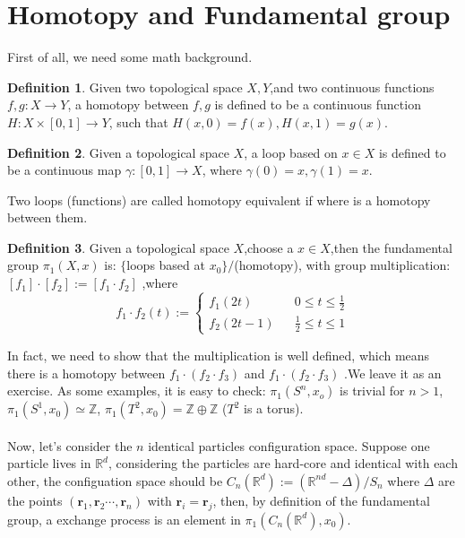 \documentclass[UTF8]{ctexart}
\theoremstyle{definition}
\newtheorem{definition}{Definition}[section]
\theoremstyle{remark}
\begin{document}
\section{Homotopy and Fundamental group}
First of all, we need some math background.
\begin{definition}
	Given two topological space $X,Y$,and two continuous functions $f,g:X\rightarrow Y$, a homotopy between $f,g$ is defined to be a continuous function $H:X\times [0,1]\rightarrow Y$, such that $H(x,0)=f(x),H(x,1)=g(x)$.
\end{definition}
\begin{definition}
	Given a topological space $X$, a loop based on $x\in X$ is defined to be a continuous map $\gamma:[0,1]\rightarrow X$, where $\gamma(0)=x,\gamma(1)=x$.
\end{definition} 
Two loops (functions) are called homotopy equivalent if where is a homotopy between them.
\begin{definition}
	Given a topological space $X$,choose a $x\in X$,then the fundamental group $\pi_1(X,x)$ is: $\{$loops based at $x_0$$\}$$/$(homotopy), with group multiplication:$[f_1]\cdot[f_2]:=[f_1\cdot f_2]$ ,where $$f_1\cdot f_2(t):=\left\{\begin{array}{rcl}
f_1(2t)&& 0\leq t\leq\frac{1}{2}\\f_2(2t-1)&&\frac{1}{2}\leq t\leq 1
	\end{array}\right.$$
\end{definition}
In fact, we need to show that the multiplication is well defined, which means there is a homotopy between $f_1\cdot(f_2\cdot f_3)$ and $f_1\cdot(f_2\cdot f_3)$ .We leave it as an exercise.
As some examples, it is easy to check: $\pi_1(S^n,x_o)$ is trivial for $n>1$,  $\pi_1(S^1,x_0)\simeq \mathbb{Z}$, $\pi_1(T^2,x_0)=\mathbb{Z\oplus Z}$ ($T^2$ is a torus).
\\\\Now, let's consider the $n$ identical particles configuration space. Suppose one particle lives in $\mathbb{R}^d$, considering the particles are hard-core and identical with each other, the configuation space should be $C_n(\mathbb{R}^d):=(\mathbb{R}^{nd}-\Delta)/S_n$ where $\Delta$ are the points $(\bm{r}_1,\bm{r}_2\cdots,\bm{r}_n)$ with $\bm{r}_i=\bm{r}_j$, then, by definition of the fundamental group, a exchange process is an element in $\pi_1(C_n(\mathbb{R}^d),x_0)$.
\end{document}
